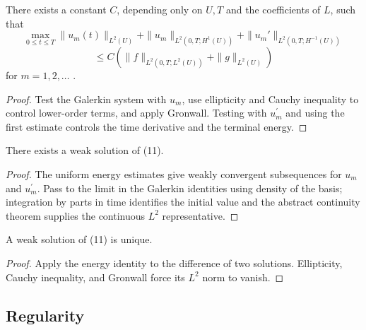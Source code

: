 \begin{theorem}
\label{thm:parabolic-energy-estimates}
There exists a constant $C$, depending only on $U, T$ and the coefficients of $L$, such that
\[
\max_{0 \leq t \leq T} \|u_m(t)\|_{L^2(U)} + \|u_m\|_{L^2(0,T; H^1(U))} + \|u_m'\|_{L^2(0,T; H^{-1}(U))}
\]
\[
\leq C(\|f\|_{L^2(0,T; L^2(U))} + \|g\|_{L^2(U)})
\]
for $m = 1, 2, \ldots$ .
\end{theorem}

\begin{proof}
\sketch Test the Galerkin system with $u_m$, use ellipticity and Cauchy inequality to control lower-order terms, and apply Gronwall. Testing with $u_m^{\prime}$ and using the first estimate controls the time derivative and the terminal energy.
\end{proof}

\begin{theorem}
\label{thm:parabolic-existence-weak-solution}
There exists a weak solution of (11).
\end{theorem}

\begin{proof}
\sketch The uniform energy estimates give weakly convergent subsequences for $u_m$ and $u_m^{\prime}$. Pass to the limit in the Galerkin identities using density of the basis; integration by parts in time identifies the initial value and the abstract continuity theorem supplies the continuous $L^2$ representative.
\end{proof}

\begin{theorem}
\label{thm:parabolic-uniqueness-weak-solution}
A weak solution of (11) is unique.
\end{theorem}

\begin{proof}
\sketch Apply the energy identity to the difference of two solutions. Ellipticity, Cauchy inequality, and Gronwall force its $L^2$ norm to vanish.
\end{proof}

\subsection{Regularity}

